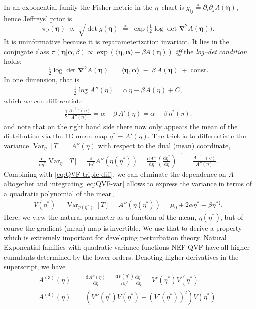 \documentclass[a4paper,11pt]{article}
\numberwithin{equation}{section}
\theoremstyle{plain}
\theoremstyle{definition}
\theoremstyle{remark}
\newcommand{\1}{\ensuremath{\mathds{1}}\xspace}
\newcommand{\bNabla}{\ensuremath{\boldsymbol{\nabla}}\xspace}
\newcommand{\dd}{\ensuremath{{\textrm{d}}}\xspace}
\newcommand{\be}{{\ensuremath{{\boldsymbol{\eta}}}}\xspace}
\newcommand{\balpha}{\boldsymbol{\alpha}}
\newcommand{\eqast}{\mathrel{\stackrel{\ast}{=}}}
\DeclareMathOperator{\Var}{Var}
\begin{document}
In an exponential family the Fisher metric in the $\eta$–chart is $g_{ij}\eqast\partial_i\partial_j A(\be)$, hence Jeffreys’ prior is
\[
\pi_J(\be)\;\propto\;\sqrt{\det g(\be)}\;\eqast\;\exp\Big(\tfrac12\log\det\bNabla^2 A(\be)\Big).
\]
It is uninformative because it is reparameterization invariant.
It lies in the conjugate class $\pi(\be|\balpha,\beta)\propto\exp(\langle\be,\balpha\rangle-\beta A(\be))$ \emph{iff} the \emph{log–det condition} holds:
\begin{equation}\label{eq:logdet-condition}
\tfrac12\log\det\bNabla^2 A(\be)\;=\;\langle\be,\balpha\rangle\;-\;\beta\,A(\be)\;+\;\text{const.}
\end{equation}
In one dimension, that is
\begin{align}
    \tfrac12\log A''(\eta)=\alpha\,\eta-\beta\,A(\eta)+C,\label{eq:NEF-QVF-DG}
\end{align}
which we can differentiate 
\begin{align}
\frac{1}{2}\frac{ A^{(3)}(\eta)}{A''(\eta)}=\alpha-\beta\,A'(\eta)=\alpha-\beta\,\eta^\ast(\eta).\label{eq:QVF-triple-diff}
\end{align}
and note that on the right hand side there now only appears the mean of the distribution via the 1D mean map $\eta^\ast=A'(\eta)$. The trick is to differentiate the variance $\Var_\eta[T]=A''(\eta)$ with respect to the dual (mean) coordinate, 
\begin{align}
    \frac{\dd }{\dd\eta^\ast}\Var_\eta[T]=\frac{\dd }{\dd\eta^\ast}A''(\eta(\eta^\ast))=\frac{\dd A''}{\dd\eta}\left(\frac{\dd\eta^\ast}{\dd\eta}\right)^{-1}=\frac{A^{(3)}(\eta)}{A''(\eta)}.\label{eq:QVF-var}
\end{align}
Combining with \eqref{eq:QVF-triple-diff}, we can eliminate the dependence on $A$ altogether and integrating \eqref{eq:QVF-var} allows to express the variance in terms of a quadratic polynomial of the mean,
\begin{align}
V(\eta^*)=\Var_{\eta(\eta^\ast)}[T]=A''(\eta(\eta^\ast))=\mu_0+2\alpha\eta^\ast-\beta\eta^\ast{}^2.\label{eq:variance-function}
\end{align}
Here, we view the natural parameter as a function of the mean, $\eta(\eta^\ast)$, but of course the gradient (mean) map is invertible.
We use that to derive a property which is extremely important for developing perturbation theory. Natural Exponential families with quadratic variance functions NEF-QVF have all higher cumulants determined by the lower orders. Denoting higher derivatives in the superscript, we have
\begin{align}
A^{(3)}(\eta)&=\frac{\dd A''(\eta)}{\dd\eta}=\frac{\dd V(\eta^\ast)}{\dd\eta^\ast}\frac{\dd\eta^\ast}{\dd\eta}=V'(\eta^\ast)V(\eta^\ast)\nonumber\\
A^{(4)}(\eta)&=(V''(\eta^\ast)V(\eta^\ast)+(V'(\eta^\ast))^2)V(\eta^\ast).\label{eq:NEF-QVF-cumulants}
\end{align}
\end{document}
